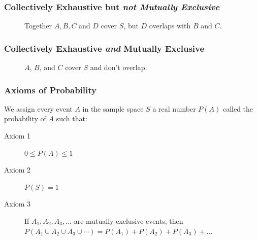 \documentclass[handout]{beamer}
\begin{document}
\begin{frame}
\frametitle{Collectively Exhaustive but \emph{not Mutually Exclusive}}
\begin{figure}
\centering
{}
\caption{Together $A, B, C$ and $D$ cover $S$, but $D$ overlaps with $B$ and $C$.}
\end{figure}
\end{frame}

\begin{frame}
\frametitle{Collectively Exhaustive \emph{and} Mutually Exclusive}
\begin{figure}
\centering
{}
\caption{$A$, $B$, and $C$ cover $S$ and don't overlap.}
\end{figure}
\end{frame}


\begin{frame}
\frametitle{Axioms of Probability}
We assign every event $A$ in the sample space $S$ a real number $P(A)$ called the \alert{probability of $A$} such that: 
\vspace{1em}
\begin{description}
	\item[Axiom 1] $0 \leq P(A) \leq 1$
	\item[Axiom 2] $P(S)=1$
	\item[Axiom 3] If $A_1, A_2, A_3, \hdots$ are mutually exclusive events, then $P(A_1\cup A_2 \cup A_3 \cup \cdots) = P(A_1) + P(A_2) + P(A_3) + \hdots$
\end{description}

\end{frame}
\end{document}
